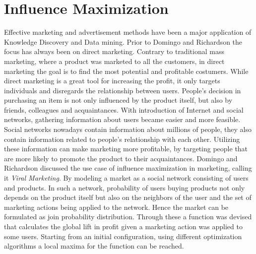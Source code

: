 \documentclass[english]{tktltiki}
\begin{document}
\section{Influence Maximization}
\label{sec:influencemax}
Effective marketing and advertisement methods have been a major application of Knowledge Discovery and Data mining. Prior to Domingo and Richardson \cite{domingo01} the focus has always been on direct marketing. Contrary to traditional mass marketing, where a product was marketed to all the customers, in direct marketing the goal is to find the most potential and profitable costumers. While direct marketing is a great tool for increasing the profit, it only targets individuals and disregards the relationship between users. People's decision in purchasing an item is not only influenced by the product itself, but also by friends, colleagues and acquaintances. With introduction of Internet and social networks, gathering information about users became easier and more feasible. Social networks nowadays contain information about millions of people, they also contain information related to people's relationship with each other. Utilizing these information can make marketing more profitable, by targeting people that are more likely to promote the product to their acquaintances. 
Domingo and Richardson \cite{domingo01} discussed the use case of influence maximization in marketing, calling it \textit{Viral Marketing}. By modeling a market as a social network consisting of users and products. In such a network, probability of users buying products not only depends on the product itself but also on the neighbors of the user and the set of marketing actions being applied to the network. Hence the market can be formulated as join probability distribution. 
Through these a function was devised that calculates the global lift in profit given a marketing action was applied to some users. Starting from an initial configuration, using different optimization algorithms a local maxima for the function can be reached. 
\end{document}
